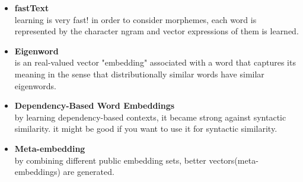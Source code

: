  \begin{itemize}
     \item \textbf{fastText}\\
     learning is very fast! in order to consider morphemes, each word is represented by the character ngram and vector expressions of them is learned\cite{web004}.
     \item \textbf{Eigenword}\\
     is an real-valued vector "embedding" associated with a word that captures its meaning in the sense that distributionally similar words have similar eigenwords.
     
     \item  \textbf{Dependency-Based Word Embeddings}\\
      by learning dependency-based contexts, it became strong against syntactic similarity. it might be good if you want to use it for syntactic similarity\cite{levy2014dependencybased}.
      
      \item \textbf{ Meta-embedding}\\
     by combining different public embedding sets, better vectors(meta-embeddings) are generated\cite{DBLP:conf/acl/YinS16}.
 \end{itemize} 
 
 
 
 








  



 
 
 








  


 









  


